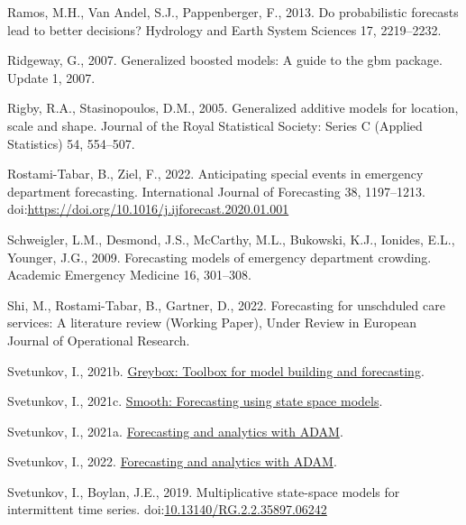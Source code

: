 \documentclass[]{elsarticle} %
\newlength{\cslhangindent}
\newlength{\cslentryspacingunit} %
\newenvironment{CSLReferences}[2] %
 {%
  \setlength{\parindent}{0pt}
  \ifodd #1
  \let\oldpar\par
  \def\par{\hangindent=\cslhangindent\oldpar}
  \fi
  \setlength{\parskip}{#2\cslentryspacingunit}
 }%
 {}
\begin{document}
\begin{CSLReferences}{1}{0}
\leavevmode{}%
Ramos, M.H., Van Andel, S.J., Pappenberger, F., 2013. Do probabilistic forecasts lead to better decisions? Hydrology and Earth System Sciences 17, 2219--2232.

\leavevmode{}%
Ridgeway, G., 2007. Generalized boosted models: A guide to the gbm package. Update 1, 2007.

\leavevmode{}%
Rigby, R.A., Stasinopoulos, D.M., 2005. {Generalized additive models for location, scale and shape}. Journal of the Royal Statistical Society: Series C (Applied Statistics) 54, 554--507.

\leavevmode{}%
Rostami-Tabar, B., Ziel, F., 2022. Anticipating special events in emergency department forecasting. International Journal of Forecasting 38, 1197--1213. doi:\url{https://doi.org/10.1016/j.ijforecast.2020.01.001}

\leavevmode{}%
Schweigler, L.M., Desmond, J.S., McCarthy, M.L., Bukowski, K.J., Ionides, E.L., Younger, J.G., 2009. Forecasting models of emergency department crowding. Academic Emergency Medicine 16, 301--308.

\leavevmode{}%
Shi, M., Rostami-Tabar, B., Gartner, D., 2022. Forecasting for unschduled care services: A literature review (Working Paper), Under Review in European Journal of Operational Research.

\leavevmode{}%
Svetunkov, I., 2021b. \href{https://github.com/config-i1/greybox}{Greybox: Toolbox for model building and forecasting}.

\leavevmode{}%
Svetunkov, I., 2021c. \href{https://github.com/config-i1/smooth}{Smooth: Forecasting using state space models}.

\leavevmode{}%
Svetunkov, I., 2021a. \href{https://openforecast.org/adam/}{Forecasting and analytics with ADAM}.

\leavevmode{}%
Svetunkov, I., 2022. \href{https://openforecast.org/adam/}{Forecasting and analytics with ADAM}.

\leavevmode{}%
Svetunkov, I., Boylan, J.E., 2019. {Multiplicative state-space models for intermittent time series}. doi:\href{https://doi.org/10.13140/RG.2.2.35897.06242}{10.13140/RG.2.2.35897.06242}


\end{CSLReferences}
\end{document}
